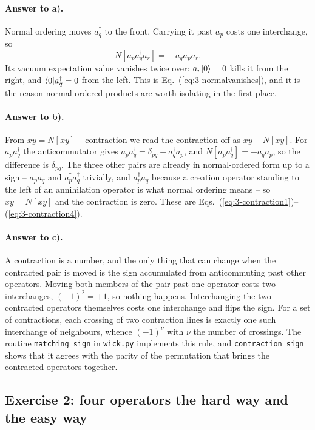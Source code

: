 \paragraph{Answer to a).}
Normal ordering moves $a_q^{\dagger}$ to the front.  Carrying it past $a_p$
costs one interchange, so
\[
  N\left[a_p a_q^{\dagger} a_r\right] = -\,a_q^{\dagger}a_p a_r .
\]
Its vacuum expectation value vanishes twice over: $a_r\vert 0 \rangle=0$ kills it
from the right, and $\langle 0 \vert a_q^{\dagger}=0$ from the left.  This is
Eq.~(\ref{eq:3-normalvanishes}), and it is the reason normal-ordered products
are worth isolating in the first place.

\paragraph{Answer to b).}
From $xy = N[xy] + \text{contraction}$ we read the contraction off as
$xy-N[xy]$.  For $a_pa_q^{\dagger}$ the anticommutator gives $a_pa_q^{\dagger}
=\delta_{pq}-a_q^{\dagger}a_p$, and $N[a_pa_q^{\dagger}]=-a_q^{\dagger}a_p$,
so the difference is $\delta_{pq}$.  The three other pairs are already in
normal-ordered form up to a sign -- $a_pa_q$ and $a_p^{\dagger}a_q^{\dagger}$
trivially, and $a_p^{\dagger}a_q$ because a creation operator standing to the
left of an annihilation operator is what normal ordering means -- so
$xy=N[xy]$ and the contraction is zero.  These are
Eqs.~(\ref{eq:3-contraction1})--(\ref{eq:3-contraction4}).

\paragraph{Answer to c).}
A contraction is a number, and the only thing that can change when the
contracted pair is moved is the sign accumulated from anticommuting past
other operators.  Moving both members of the pair past one operator costs two
interchanges, $(-1)^2=+1$, so nothing happens.  Interchanging the two
contracted operators themselves costs one interchange and flips the sign.  For
a set of contractions, each crossing of two contraction lines is exactly one
such interchange of neighbours, whence $(-1)^{\nu}$ with $\nu$ the number of
crossings.  The routine \texttt{matching\_sign} in \texttt{wick.py} implements
this rule, and \texttt{contraction\_sign} shows that it agrees with the parity
of the permutation that brings the contracted operators together.

\subsection*{Exercise 2: four operators the hard way and the easy way}
\label{ex:3-fouroperators}

